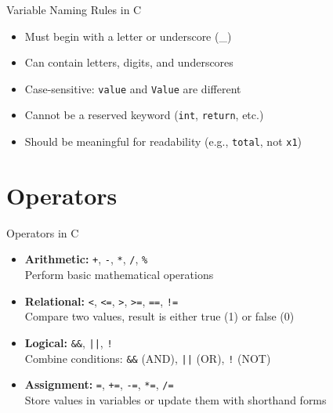 \documentclass[12pt, aspectratio=169]{beamer}
\begin{document}
    \begin{frame}{Variable Naming Rules in C}
        \begin{itemize}
            \item Must begin with a letter or underscore (\_)
            \item Can contain letters, digits, and underscores
            \item Case-sensitive: \texttt{value} and \texttt{Value} are different
            \item Cannot be a reserved keyword (\texttt{int}, \texttt{return}, etc.)
            \item Should be meaningful for readability (e.g., \texttt{total}, not \texttt{x1})
        \end{itemize}
    \end{frame}


    \section{Operators}

    \begin{frame}{Operators in C}
        \begin{itemize}
            \item \textbf{Arithmetic:} \texttt{+}, \texttt{-}, \texttt{*}, \texttt{/}, \texttt{\%} \\
                Perform basic mathematical operations
            \item \textbf{Relational:} \texttt{<}, \texttt{<=}, \texttt{>}, \texttt{>=}, \texttt{==}, \texttt{!=} \\
                Compare two values, result is either true (1) or false (0)
            \item \textbf{Logical:} \texttt{\&\&}, \texttt{||}, \texttt{!} \\
                Combine conditions: \texttt{\&\&} (AND), \texttt{||} (OR), \texttt{!} (NOT)
            \item \textbf{Assignment:} \texttt{=}, \texttt{+=}, \texttt{-=}, \texttt{*=}, \texttt{/=} \\
                Store values in variables or update them with shorthand forms
        \end{itemize}
    \end{frame}
\end{document}
